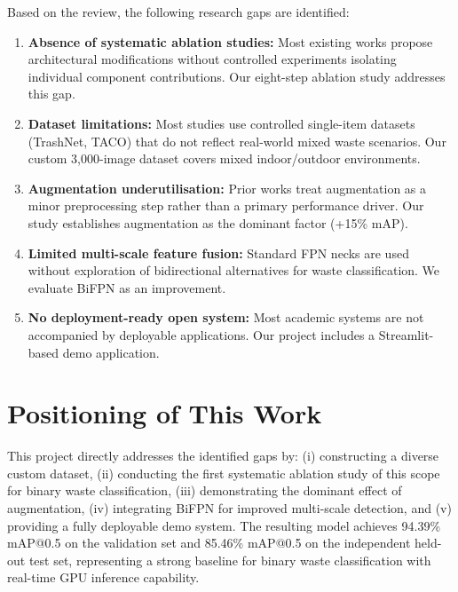 Based on the review, the following research gaps are identified:

\begin{enumerate}
    \item \textbf{Absence of systematic ablation studies:} Most existing works propose architectural modifications without controlled experiments isolating individual component contributions. Our eight-step ablation study addresses this gap.
    \item \textbf{Dataset limitations:} Most studies use controlled single-item datasets (TrashNet, TACO) that do not reflect real-world mixed waste scenarios. Our custom 3,000-image dataset covers mixed indoor/outdoor environments.
    \item \textbf{Augmentation underutilisation:} Prior works treat augmentation as a minor preprocessing step rather than a primary performance driver. Our study establishes augmentation as the dominant factor (+15\% mAP).
    \item \textbf{Limited multi-scale feature fusion:} Standard FPN necks are used without exploration of bidirectional alternatives for waste classification. We evaluate BiFPN as an improvement.
    \item \textbf{No deployment-ready open system:} Most academic systems are not accompanied by deployable applications. Our project includes a Streamlit-based demo application.
\end{enumerate}

\section{Positioning of This Work}

This project directly addresses the identified gaps by: (i) constructing a diverse custom dataset, (ii) conducting the first systematic ablation study of this scope for binary waste classification, (iii) demonstrating the dominant effect of augmentation, (iv) integrating BiFPN for improved multi-scale detection, and (v) providing a fully deployable demo system. The resulting model achieves 94.39\% mAP@0.5 on the validation set and 85.46\% mAP@0.5 on the independent held-out test set, representing a strong baseline for binary waste classification with real-time GPU inference capability.
